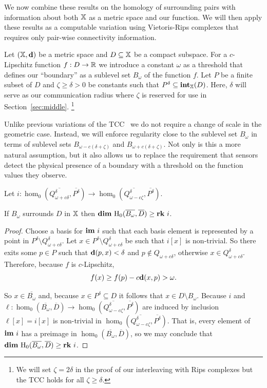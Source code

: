 
We now combine these results on the homology of surrounding pairs with information about both $\mathbb{X}$ as a metric space and our function.
We will then apply these results as a computable variation using Vietoris-Rips complexes that requires only pair-wise connectivity information.

Let $(\mathbb{X},\mathbf{d})$ be a metric space and $D\subseteq \mathbb{X}$ be a compact subspace.
For a $c$-Lipschitz function $f : D\to \mathbb{R}$ we introduce a constant $\omega$ as a threshold that defines our ``boundary'' as a sublevel set $B_\omega$ of the function $f$.
Let $P$ be a finite subset of $D$ and $\zeta\geq\delta > 0 $ be constants such that $P^\delta\subseteq \mathbf{int}_{\mathbb{X}}(D)$.
Here, $\delta$ will serve as our communication radius where $\zeta$ is reserved for use in Section~\ref{sec:middle}.
  \footnote{We will set $\zeta = 2\delta$ in the proof of our interleaving with Rips complexes but the TCC holds for all $\zeta\geq\delta$.}

Unlike previous variations of the TCC~\cite{cavanna2017when} we do not require a change of scale in the geometric case.
Instead, we will enforce regularity close to the sublevel set $B_\omega$ in terms of sublevel sets $B_{\omega-c(\delta+\zeta)}$ and $B_{\omega+c(\delta+\zeta)}$.
Not only is this a more natural assumption, but it also allows us to replace the requirement that sensors detect the physical presence of a boundary with a threshold on the function values they observe.


\begin{lemma}\label{lem:psurj}
  Let $i : \hom_0(\overline{Q_{\omega+c\delta}^\delta}, \overline{P^\delta})\to \hom_0(\overline{Q_{\omega-c\zeta}^\delta}, \overline{P^\delta})$.

  If $B_\omega$ surrounds $D$ in $\mathbb{X}$ then $\mathbf{dim}~\mathrm{H}_0(\overline{B_\omega}, \overline{D})\geq \mathbf{rk}~i$.
\end{lemma}
\begin{proof}
  Choose a basis for $\mathbf{im}~i$ such that each basis element is represented by a point in $P^\delta\setminus Q_{\omega+c\delta}^\delta$.
  Let $x\in P^\delta\setminus Q_{\omega+c\delta}^\delta$ be such that $i[x]$ is non-trivial.
  So there exits some $p\in P$ such that $\mathbf{d}(p, x) < \delta$ and $p\notin Q_{\omega+c\delta}$, otherwise $x\in Q_{\omega+c\delta}^\delta$.
  Therefore, because $f$ is $c$-Lipschitz,
  \[ f(x)\geq f(p) - c\mathbf{d}(x, p) > \omega.\]

  So $x\in\overline{B_\omega}$ and, because $x\in P^\delta\subseteq D$ it follows that $x\in D\setminus B_\omega$.
  Because $i$ and $\ell : \hom_0(\overline{B_\omega}, \overline{D})\to \hom_0(\overline{Q_{\omega-c\zeta}^\delta}, \overline{P^\delta})$ are induced by inclusion $\ell[x] = i[x]$ is non-trivial in $\hom_0(\overline{Q_{\omega-c\zeta}^\delta}, \overline{P^\delta})$.
  That is, every element of $\mathbf{im}~i$ has a preimage in $\hom_0(\overline{B_\omega}, \overline{D})$, so we may conclude that $\mathbf{dim}~\mathrm{H}_0(\overline{B_\omega}, \overline{D})\geq \mathbf{rk}~i$.
\end{proof}

